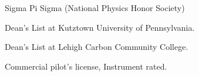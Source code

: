 



\begin{cventries}




\cventry
{}
{}
{}
{}
{
\begin{cvitems}
\item {Sigma Pi Sigma (National Physics Honor Society)}
\item {Dean's List at Kutztown University of Pennsylvania.}
\item {Dean's List at Lehigh Carbon Community College.}
\item {Commercial pilot's license, Instrument rated.}
\end{cvitems}
}




\end{cventries}